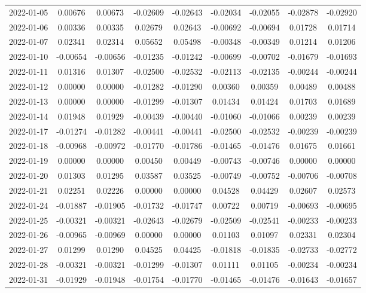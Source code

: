 \begin{footnotesize}
\begin{longtable}{lcccccccc}
2022-01-05 & 0.00676 & 0.00673 & -0.02609 & -0.02643 & -0.02034 & -0.02055 & -0.02878 & -0.02920 \\
2022-01-06 & 0.00336 & 0.00335 & 0.02679 & 0.02643 & -0.00692 & -0.00694 & 0.01728 & 0.01714 \\
2022-01-07 & 0.02341 & 0.02314 & 0.05652 & 0.05498 & -0.00348 & -0.00349 & 0.01214 & 0.01206 \\
2022-01-10 & -0.00654 & -0.00656 & -0.01235 & -0.01242 & -0.00699 & -0.00702 & -0.01679 & -0.01693 \\
2022-01-11 & 0.01316 & 0.01307 & -0.02500 & -0.02532 & -0.02113 & -0.02135 & -0.00244 & -0.00244 \\
2022-01-12 & 0.00000 & 0.00000 & -0.01282 & -0.01290 & 0.00360 & 0.00359 & 0.00489 & 0.00488 \\
2022-01-13 & 0.00000 & 0.00000 & -0.01299 & -0.01307 & 0.01434 & 0.01424 & 0.01703 & 0.01689 \\
2022-01-14 & 0.01948 & 0.01929 & -0.00439 & -0.00440 & -0.01060 & -0.01066 & 0.00239 & 0.00239 \\
2022-01-17 & -0.01274 & -0.01282 & -0.00441 & -0.00441 & -0.02500 & -0.02532 & -0.00239 & -0.00239 \\
2022-01-18 & -0.00968 & -0.00972 & -0.01770 & -0.01786 & -0.01465 & -0.01476 & 0.01675 & 0.01661 \\
2022-01-19 & 0.00000 & 0.00000 & 0.00450 & 0.00449 & -0.00743 & -0.00746 & 0.00000 & 0.00000 \\
2022-01-20 & 0.01303 & 0.01295 & 0.03587 & 0.03525 & -0.00749 & -0.00752 & -0.00706 & -0.00708 \\
2022-01-21 & 0.02251 & 0.02226 & 0.00000 & 0.00000 & 0.04528 & 0.04429 & 0.02607 & 0.02573 \\
2022-01-24 & -0.01887 & -0.01905 & -0.01732 & -0.01747 & 0.00722 & 0.00719 & -0.00693 & -0.00695 \\
2022-01-25 & -0.00321 & -0.00321 & -0.02643 & -0.02679 & -0.02509 & -0.02541 & -0.00233 & -0.00233 \\
2022-01-26 & -0.00965 & -0.00969 & 0.00000 & 0.00000 & 0.01103 & 0.01097 & 0.02331 & 0.02304 \\
2022-01-27 & 0.01299 & 0.01290 & 0.04525 & 0.04425 & -0.01818 & -0.01835 & -0.02733 & -0.02772 \\
2022-01-28 & -0.00321 & -0.00321 & -0.01299 & -0.01307 & 0.01111 & 0.01105 & -0.00234 & -0.00234 \\
2022-01-31 & -0.01929 & -0.01948 & -0.01754 & -0.01770 & -0.01465 & -0.01476 & -0.01643 & -0.01657 \\

\end{longtable}
\end{footnotesize}
